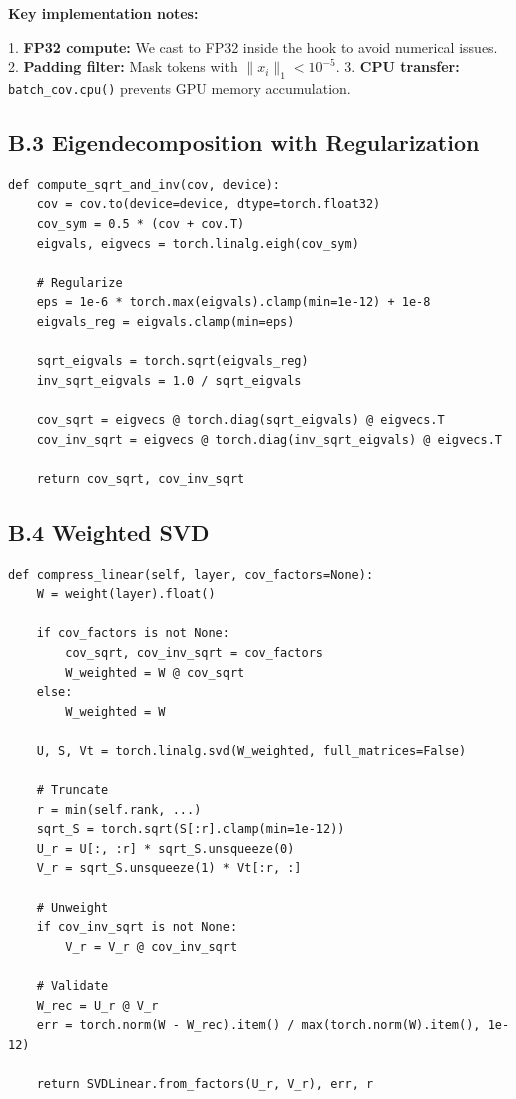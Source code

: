 \textbf{Key implementation notes:}

1. \textbf{FP32 compute:} We cast to FP32 inside the hook to avoid numerical issues.
2. \textbf{Padding filter:} Mask tokens with $\|x_i\|_1 < 10^{-5}$.
3. \textbf{CPU transfer:} \texttt{batch\_cov.cpu()} prevents GPU memory accumulation.

\subsection{B.3 Eigendecomposition with Regularization}

\begin{lstlisting}
def compute_sqrt_and_inv(cov, device):
    cov = cov.to(device=device, dtype=torch.float32)
    cov_sym = 0.5 * (cov + cov.T)
    eigvals, eigvecs = torch.linalg.eigh(cov_sym)
    
    # Regularize
    eps = 1e-6 * torch.max(eigvals).clamp(min=1e-12) + 1e-8
    eigvals_reg = eigvals.clamp(min=eps)
    
    sqrt_eigvals = torch.sqrt(eigvals_reg)
    inv_sqrt_eigvals = 1.0 / sqrt_eigvals
    
    cov_sqrt = eigvecs @ torch.diag(sqrt_eigvals) @ eigvecs.T
    cov_inv_sqrt = eigvecs @ torch.diag(inv_sqrt_eigvals) @ eigvecs.T
    
    return cov_sqrt, cov_inv_sqrt
\end{lstlisting}

\subsection{B.4 Weighted SVD}

\begin{lstlisting}
def compress_linear(self, layer, cov_factors=None):
    W = weight(layer).float()
    
    if cov_factors is not None:
        cov_sqrt, cov_inv_sqrt = cov_factors
        W_weighted = W @ cov_sqrt
    else:
        W_weighted = W
    
    U, S, Vt = torch.linalg.svd(W_weighted, full_matrices=False)
    
    # Truncate
    r = min(self.rank, ...)
    sqrt_S = torch.sqrt(S[:r].clamp(min=1e-12))
    U_r = U[:, :r] * sqrt_S.unsqueeze(0)
    V_r = sqrt_S.unsqueeze(1) * Vt[:r, :]
    
    # Unweight
    if cov_inv_sqrt is not None:
        V_r = V_r @ cov_inv_sqrt
    
    # Validate
    W_rec = U_r @ V_r
    err = torch.norm(W - W_rec).item() / max(torch.norm(W).item(), 1e-12)
    
    return SVDLinear.from_factors(U_r, V_r), err, r
\end{lstlisting}


